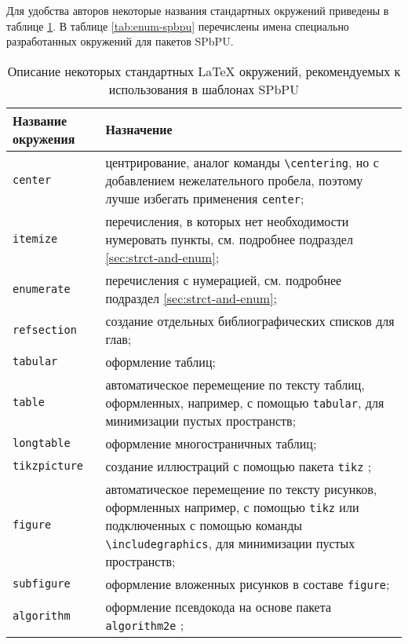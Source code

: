 Для удобства авторов некоторые названия стандартных окружений приведены в таблице \ref{tab:enum-std}. В таблице \ref{tab:enum-spbpu}  перечислены имена специально разработанных окружений для пакетов SPbPU.





	\begin{table} [htbp]%
	\centering
	\caption{Описание некоторых стандартных \LaTeX{} окружений, рекомендуемых к использования в шаблонах SPbPU}%
	\label{tab:enum-std}
		\begin{SingleSpace}
		\begin{tabular}{|l|p{11cm}|} 
			\hline
			Название окружения&Назначение\\
			\hline
			\verb|center| & центрирование, аналог команды \verb|\centering|, но с добавлением нежелательного пробела, поэтому лучше избегать применения \verb|center|; \\
			\verb|itemize| &{перечисления, в которых нет необходимости нумеровать  пункты, см. подробнее подраздел \ref{sec:strct-and-enum};}\\
			\verb|enumerate| & перечисления с нумерацией, см. подробнее подраздел \ref{sec:strct-and-enum}; \\
			\verb|refsection| & создание отдельных библиографических списков для глав; \\
			\verb|tabular| & оформление таблиц; \\
			\verb|table|   &{автоматическое перемещение по тексту таблиц, оформленных, например, с помощью \verb|tabular|, для минимизации пустых пространств;} \\
			\verb|longtable| & оформление многостраничных таблиц; \\
			\verb|tikzpicture| & создание иллюстраций с помощью пакета \verb|tikz| \cite{ctan-tikz}; \\
			\verb|figure| &{автоматическое перемещение по тексту рисунков, оформленных например, с помощью \verb|tikz| или подключенных с помощью команды \verb|\includegraphics|, для минимизации пустых пространств;}\\
			\verb|subfigure| & оформление вложенных рисунков в составе \verb|figure|; \\
			\verb|algorithm| &{оформление псевдокода на основе пакета \verb|algorithm2e| \cite{ctan-algorithm2e};} \\

\end{tabular}
\end{SingleSpace}
\end{table}
